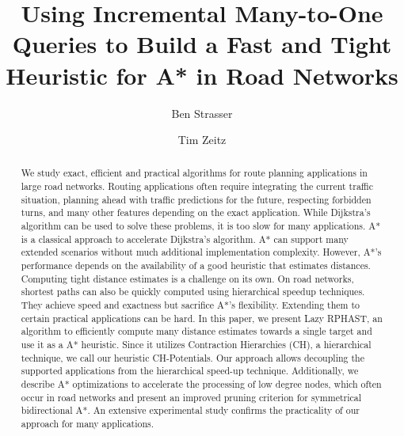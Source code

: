 \documentclass[manuscript,review]{acmart}
\begin{document}

\title{Using Incremental Many-to-One Queries to Build a Fast and Tight Heuristic for A* in Road Networks}

\author{Ben Strasser}
\affiliation{}

\author{Tim Zeitz}


\renewcommand{\shortauthors}{B. Strasser and T. Zeitz}


\begin{abstract}
We study exact, efficient and practical algorithms for route planning applications in large road networks.
Routing applications often require integrating the current traffic situation, planning ahead with traffic predictions for the future, respecting forbidden turns, and many other features depending on the exact application.
While Dijkstra's algorithm can be used to solve these problems, it is too slow for many applications.
A* is a classical approach to accelerate Dijkstra's algorithm.
A* can support many extended scenarios without much additional implementation complexity.
However, A*'s performance depends on the availability of a good heuristic that estimates distances.
Computing tight distance estimates is a challenge on its own.
On road networks, shortest paths can also be quickly computed using hierarchical speedup techniques.
They achieve speed and exactness but sacrifice A*'s flexibility.
Extending them to certain practical applications can be hard.
In this paper, we present Lazy RPHAST, an algorithm to efficiently compute many distance estimates towards a single target and use it as a A* heuristic.
Since it utilizes Contraction Hierarchies (CH), a hierarchical technique, we call our heuristic CH-Potentials.
Our approach allows decoupling the supported applications from the hierarchical speed-up technique.
Additionally, we describe A* optimizations to accelerate the processing of low degree nodes, which often occur in road networks and present an improved pruning criterion for symmetrical bidirectional A*.
An extensive experimental study confirms the practicality of our approach for many applications.
\end{abstract}
\end{document}
